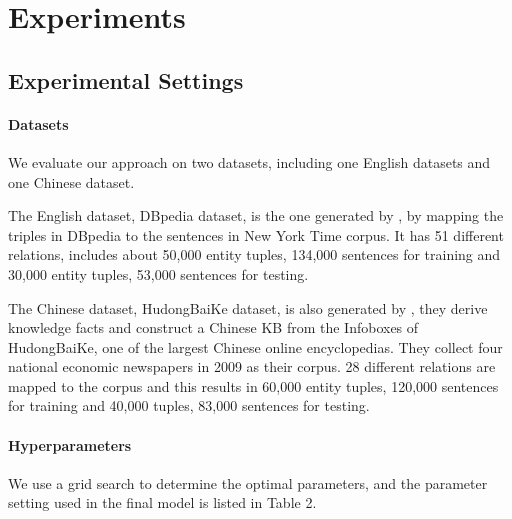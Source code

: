 \section{Experiments}

\subsection{Experimental Settings}
\paragraph{Datasets}
We evaluate our approach on two datasets, including one English datasets and one Chinese dataset.

The English dataset, DBpedia dataset, is the one generated by \cite{chen2014encoding}, by mapping the triples in DBpedia \cite{bizer2009dbpedia} to the sentences in New York Time corpus. It has 51 different relations, includes about 50,000 entity tuples, 134,000 sentences for training and 30,000 entity tuples, 53,000 sentences for testing.

The Chinese dataset, HudongBaiKe dataset, is also generated by \cite{chen2014encoding}, they derive knowledge facts and construct a Chinese KB from the Infoboxes of HudongBaiKe, one of the largest Chinese online encyclopedias. They collect four national economic newspapers in 2009 as their corpus. 28 different relations are mapped to the corpus and this results in 60,000 entity tuples, 120,000 sentences for training and 40,000 tuples, 83,000 sentences for testing.

\paragraph{Hyperparameters}
We use a grid search to determine the optimal parameters, and the parameter setting used in the final model is listed in Table 2.

